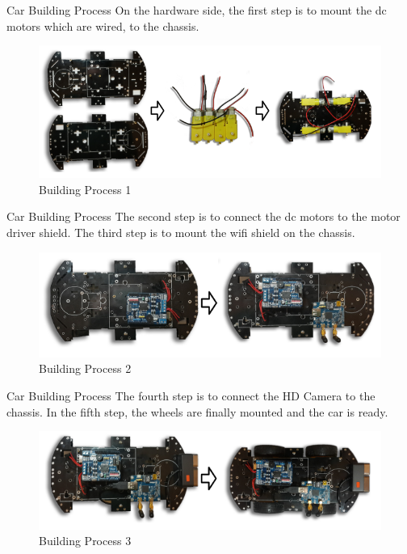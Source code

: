 \documentclass[xcolor=table, 9pt]{beamer}
\begin{document}
\begin{frame}{Car Building Process}
On the hardware side, the first step is to mount the dc motors which are wired, to the chassis.\\
\begin{figure}[h]
\includegraphics[width=1\linewidth]{build1.png}
\caption{Building Process 1}
\end{figure}
\end{frame}

\begin{frame}{Car Building Process}
The second step is to connect the dc motors to the motor driver shield. The third step is to mount the wifi shield on the chassis.
\begin{figure}[h]
\includegraphics[width=1\linewidth]{build2.png}
\caption{Building Process 2}
\end{figure}
\end{frame}

\begin{frame}{Car Building Process}
The fourth step is to connect the HD Camera to the chassis. In the fifth step, the wheels are finally
mounted and the car is ready.
\begin{figure}[h]
\includegraphics[width=1\linewidth]{build3.png}
\caption{Building Process 3}
\end{figure}
\end{frame}
\end{document}
